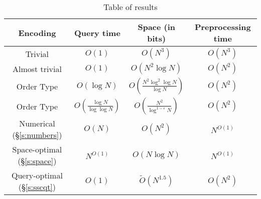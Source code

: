 \begin{table}
\centering
\caption{Table of results}\label{tor}
\begin{tabular}{cccc}
Encoding & Query time & Space (in bits) & Preprocessing time \\ \hline
Trivial & $O(1)$ & $O(N^3)$ & $O(N^3)$ \\
Almost trivial & $O(1)$ & $O(N^2 \log N)$ & $O(N^2)$ \\
Order Type \cite{CCILO18} & $O(\log N)$ & $O(\frac{N^2 \log^2 \log N}{\log N})$ & $O(N^2) $\\
Order Type \cite{CCILO18} & $O(\frac{\log N}{\log \log N})$ & $O(\frac{N^2 }{\log^{1-\epsilon} N})$ & $O(N^2)$ \\
Numerical (\S\ref{s:numbers}) & $O(N)$ & $O(N^2)$ & $N^{O(1)}$\\
Space-optimal (\S\ref{s:space}) & $N^{O(1)}$ & $O(N \log N)$ & $N^{O(1)}$\\
Query-optimal (\S\ref{s:sscqt}) &  $O(1)$ & $\tilde{O}(N^{1.5})$ & $O(N^{2})$ \\
\end{tabular}
\end{table}
